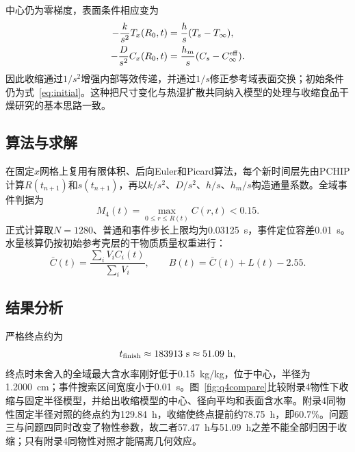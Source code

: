 \documentclass[UTF8,a4paper,zihao=-4,fontset=fandol]{ctexart}
\begin{document}
中心仍为零梯度，表面条件相应变为
\begin{align}
 -\frac{k}{s^2}T_x(R_0,t)&=\frac{h}{s}(T_s-T_\infty),\\
 -\frac{D}{s^2}C_x(R_0,t)&=\frac{h_m}{s}(C_s-C_\infty^{\rm eff}).
 \label{eq:q4bc}
\end{align}
因此收缩通过$1/s^2$增强内部等效传递，并通过$1/s$修正参考域表面交换；初始条件仍为式~\eqref{eq:initial}。这种把尺寸变化与热湿扩散共同纳入模型的处理与收缩食品干燥研究的基本思路一致\cite{rovedo1997}。
\subsection{算法与求解}
在固定$x$网格上复用有限体积、后向Euler和Picard算法，每个新时间层先由PCHIP计算$R(t_{n+1})$和$s(t_{n+1})$，再以$k/s^2$、$D/s^2$、$h/s$、$h_m/s$构造通量系数。全域事件判据为
\[
M_4(t)=\max_{0\le r\le R(t)}C(r,t)<0.15.
\]
正式计算取$N=1280$、普通和事件步长上限均为0.03125~s，事件定位容差0.01~s。水量核算仍按初始参考壳层的干物质质量权重进行：
\begin{equation}
 \bar C(t)=\frac{\sum_iV_iC_i(t)}{\sum_iV_i},\qquad
 B(t)=\bar C(t)+L(t)-2.55.
\end{equation}
\subsection{结果分析}
\begin{table}[htbp]
\centering\scriptsize
\caption{考虑收缩时的干基含水率与半径}\label{tab:q4c}
\end{table}
严格终点约为
\[
t_{\rm finish}\approx183913~{\rm s}\approx51.09~{\rm h},
\]
终点时未舍入的全域最大含水率刚好低于0.15~kg/kg，位于中心，半径为1.2000~cm；事件搜索区间宽度小于0.01~s。图~\ref{fig:q4compare}比较附录4物性下收缩与固定半径模型，并给出收缩模型的中心、径向平均和表面含水率。附录4同物性固定半径对照的终点约为129.84~h，收缩使终点提前约78.75~h，即60.7\%。问题三与问题四同时改变了物性参数，故二者57.47~h与51.09~h之差不能全部归因于收缩；只有附录4同物性对照才能隔离几何效应。
\end{document}
